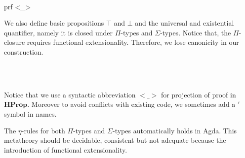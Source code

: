 \begin{code}\>\<%
\\
\>  \AgdaSymbol{:}  \<%
\\
\>[0]\<[2]%
\>[2] \<%
\\
\>[0]\<[2]%
\>[2]\<%
\\
\>[2]\<[4]%
\>[4] \AgdaSymbol{:} \<%
\\
\>[2]\<[4]%
\>[4] \AgdaSymbol{:} \AgdaSymbol{\{}  \AgdaSymbol{:} \AgdaSymbol{\}}    \<%
\\
\>    \AgdaSymbol{(}prf  <\_>\AgdaSymbol{)}\<%
\end{code}

We also define basic propositions $\top$ and $\bot$ and the universal and existential quantifier, namely it is closed under $\Pi$-types and $\Sigma$-types. Notice that, the $\Pi$-closure requires functional extensionality. Therefore, we lose canonicity in our construction.

\begin{code}\>\<
%
\\
\> \AgdaSymbol{:} \AgdaSymbol{(} \AgdaSymbol{:} \AgdaSymbol{)(} \AgdaSymbol{:}   \AgdaSymbol{)}  \<%
\\
\>   \AgdaSymbol{=}  \AgdaSymbol{((} \AgdaSymbol{:} \AgdaSymbol{)}  \AgdaFunction{<}   \AgdaFunction{>}\AgdaSymbol{)} \AgdaSymbol{(}     \AgdaSymbol{(} \AgdaSymbol{)))}\<%
\>\<\end{code}

Notice that we use a syntactic abbreviation $<\_>$ for projection of proof in $\textbf{HProp}$. Moreover to avoid conflicts with existing code, we sometimes add a $'$ symbol in names. 

The $\eta$-rules for both $\Pi$-types and $\Sigma$-types automatically holds in Agda. This metatheory should be decidable, consistent but not adequate because the introduction of functional extensionality.

